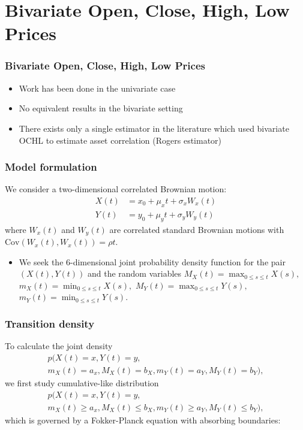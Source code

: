 \documentclass{beamer}
\begin{document}
\section{Bivariate Open, Close, High, Low Prices}
\begin{frame}
  \frametitle{Bivariate Open, Close, High, Low Prices}
  \begin{itemize}
  \item Work has been done in the univariate case
  \item No equivalent results in the bivariate setting
  \item There exists only a single estimator in the literature which
    used bivariate OCHL to estimate asset correlation \cite{rogers2008estimating} (Rogers estimator)
  \end{itemize}
\end{frame}
\begin{frame}
  \frametitle{Model formulation}
  We consider a two-dimensional correlated Brownian motion:
\begin{align*}
  X(t) &= x_0 + \mu_x t + \sigma_x W_x(t)  \\
  Y(t) &= y_0 + \mu_y t + \sigma_y W_y(t) 
\end{align*}
where $W_x(t)$ and $W_y(t)$ are correlated standard Brownian motions
with $\mbox{Cov}(W_x(t), W_x(t)) = \rho t$.

\begin{itemize}
\item We seek the 6-dimensional joint probability density
function for the pair $(X(t), Y(t))$ and the random variables
$M_X(t)=\max_{0\leq s\leq t}X(s),$ $m_X(t)=\min_{0\leq s\leq t}X(s),$
$M_Y(t)=\max_{0\leq s\leq t}Y(s),$ $m_Y(t)=\min_{0\leq s\leq t}Y(s)$.
\end{itemize}
\end{frame}
\begin{frame}
  \frametitle{Transition density} To calculate the joint density
  \begin{multline*}
    p(X(t) = x, Y(t) = y, \\
    m_X(t) = a_x, M_X(t) = b_X, m_Y(t) = a_Y, M_Y(t) = b_Y),
  \end{multline*}
  we first study cumulative-like distribution
  \begin{multline*}
    p(X(t) = x, Y(t) = y, \\
    m_X(t) \geq a_x, M_X(t) \leq b_X, m_Y(t) \geq
    a_Y, M_Y(t) \leq b_Y),
  \end{multline*}
  which is governed by a Fokker-Planck equation with absorbing boundaries:
\end{frame}
\end{document}
